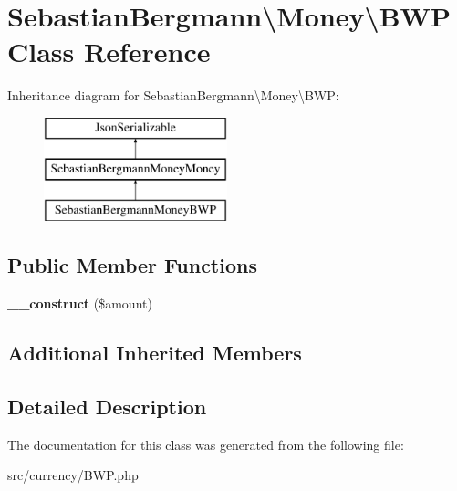 \hypertarget{classSebastianBergmann_1_1Money_1_1BWP}{}\section{Sebastian\+Bergmann\textbackslash{}Money\textbackslash{}B\+W\+P Class Reference}
\label{classSebastianBergmann_1_1Money_1_1BWP}
Inheritance diagram for Sebastian\+Bergmann\textbackslash{}Money\textbackslash{}B\+W\+P\+:\begin{figure}[H]
\begin{center}
\leavevmode
\includegraphics[height=3.000000cm]{classSebastianBergmann_1_1Money_1_1BWP}
\end{center}
\end{figure}
\subsection*{Public Member Functions}
\begin{DoxyCompactItemize}
\item 
\hypertarget{classSebastianBergmann_1_1Money_1_1BWP_a6f4f347a15dbcaff429fe408467d55e1}{}{\bfseries \+\_\+\+\_\+construct} (\$amount)\label{classSebastianBergmann_1_1Money_1_1BWP_a6f4f347a15dbcaff429fe408467d55e1}

\end{DoxyCompactItemize}
\subsection*{Additional Inherited Members}


\subsection{Detailed Description}


The documentation for this class was generated from the following file\+:\begin{DoxyCompactItemize}
\item 
src/currency/B\+W\+P.\+php\end{DoxyCompactItemize}
